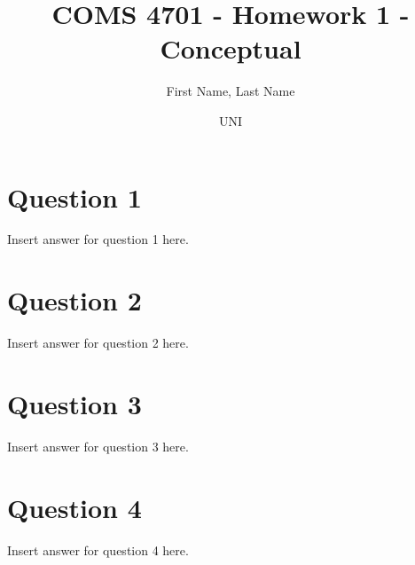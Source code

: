 \documentclass{article}
\title{COMS 4701 - Homework 1 - Conceptual}
\author
{
First Name, Last Name
\and UNI
}
\begin{document}
    \maketitle
    \section*{Question 1}
    Insert answer for question 1 here.
    \newpage
    \section*{Question 2}
    Insert answer for question 2 here.
    \newpage
    \section*{Question 3}
    Insert answer for question 3 here.
    \newpage
    \section*{Question 4}
    Insert answer for question 4 here.
   
\end{document}
